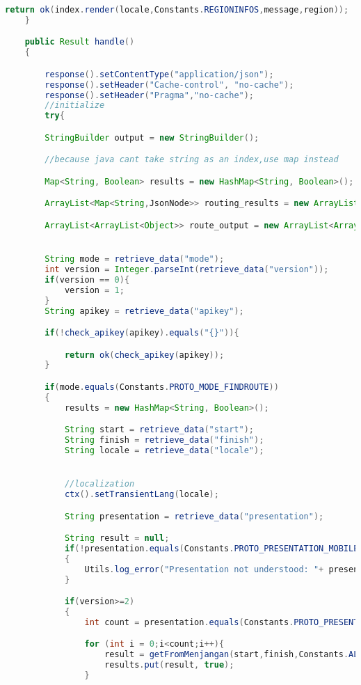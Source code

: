 \begin{lstlisting}[language=Java,basicstyle=\tiny,caption=Application.java]
        return ok(index.render(locale,Constants.REGIONINFOS,message,region));
    }

    public Result handle()
    {

        response().setContentType("application/json");
        response().setHeader("Cache-control", "no-cache");
        response().setHeader("Pragma","no-cache");
        //initialize
        try{

        StringBuilder output = new StringBuilder();

        //because java cant take string as an index,use map instead

        Map<String, Boolean> results = new HashMap<String, Boolean>();

        ArrayList<Map<String,JsonNode>> routing_results = new ArrayList<Map<String,JsonNode>>();

        ArrayList<ArrayList<Object>> route_output = new ArrayList<ArrayList<Object>>();


        String mode = retrieve_data("mode");
        int version = Integer.parseInt(retrieve_data("version"));
        if(version == 0){
            version = 1;
        }
        String apikey = retrieve_data("apikey");

        if(!check_apikey(apikey).equals("{}")){

            return ok(check_apikey(apikey));
        }

        if(mode.equals(Constants.PROTO_MODE_FINDROUTE))
        {
            results = new HashMap<String, Boolean>();

            String start = retrieve_data("start");
            String finish = retrieve_data("finish");
            String locale = retrieve_data("locale");


            //localization
            ctx().setTransientLang(locale);

            String presentation = retrieve_data("presentation");

            String result = null;
            if(!presentation.equals(Constants.PROTO_PRESENTATION_MOBILE) && !presentation.equals(Constants.PROTO_PRESENTATION_DESKTOP))
            {
                Utils.log_error("Presentation not understood: "+ presentation);
            }

            if(version>=2)
            {
                int count = presentation.equals(Constants.PROTO_PRESENTATION_MOBILE)?1:Constants.ALTERNATIVES.length;

                for (int i = 0;i<count;i++){
                    result = getFromMenjangan(start,finish,Constants.ALTERNATIVES[i].getMw(),Constants.ALTERNATIVES[i].getWm(),Constants.ALTERNATIVES[i].getPt());
                    results.put(result, true);
                }


\end{lstlisting}
